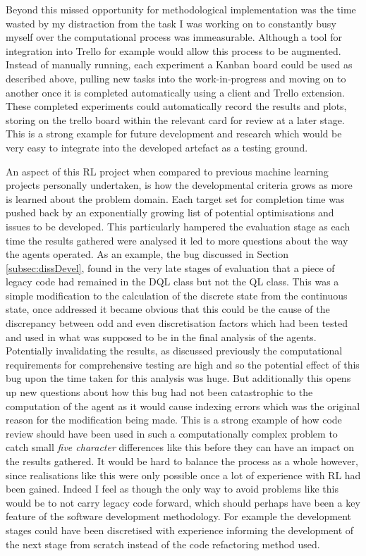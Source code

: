 \documentclass[hidelinks,journal]{IEEEtran}
\begin{document}
Beyond this missed opportunity for methodological implementation was the time wasted by my distraction from the task I was working on to constantly busy myself over the computational process was immeasurable. Although a tool for integration into Trello for example would allow this process to be augmented. Instead of manually running, each experiment a Kanban board could be used as described above, pulling new tasks into the work-in-progress and moving on to another once it is completed automatically using a client and Trello extension. These completed experiments could automatically record the results and plots, storing on the trello board within the relevant card for review at a later stage. This is a strong example for future development and research which would be very easy to integrate into the developed artefact as a testing ground.

An aspect of this RL project when compared to previous machine learning projects personally undertaken, is how the developmental criteria grows as more is learned about the problem domain. Each target set for completion time was pushed back by an exponentially growing list of potential optimisations and issues to be developed. This particularly hampered the evaluation stage as each time the results gathered were analysed it led to more questions about the way the agents operated. As an example, the bug discussed in Section \ref{subsec:dissDevel}, found in the very late stages of evaluation that a piece of legacy code had remained in the DQL class but not the QL class. This was a simple modification to the calculation of the discrete state from the continuous state, once addressed it became obvious that this could be the cause of the discrepancy between odd and even discretisation factors which had been tested and used in what was supposed to be in the final analysis of the agents. Potentially invalidating the results, as discussed previously the computational requirements for comprehensive testing are high and so the potential effect of this bug upon the time taken for this analysis was huge. But additionally this opens up new questions about how this bug had not been catastrophic to the computation of the agent as it would cause indexing errors which was the original reason for the modification being made. This is a strong example of how code review should have been used in such a computationally complex problem to catch small \textit{five character} differences like this before they can have an impact on the results gathered. It would be hard to balance the process as a whole however, since realisations like this were only possible once a lot of experience with RL had been gained. Indeed I feel as though the only way to avoid problems like this would be to not carry legacy code forward, which should perhaps have been a key feature of the software development methodology. For example the development stages could have been discretised with experience informing the development of the next stage from scratch instead of the code refactoring method used.
\end{document}
